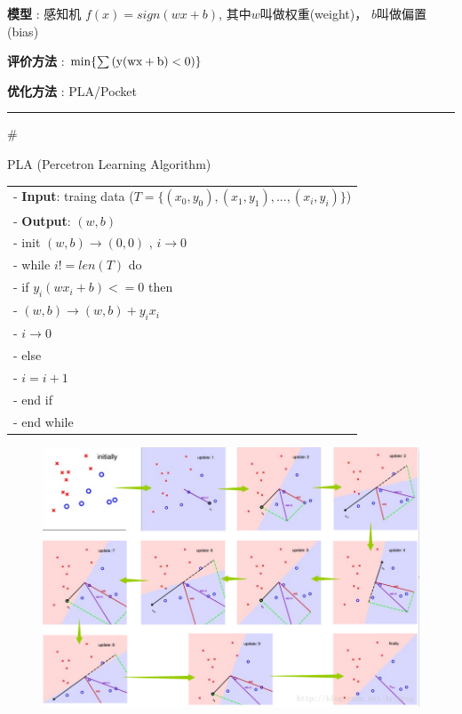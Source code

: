 \documentclass[11pt]{article}
\makeatletter
\def\maxwidth{\ifdim\Gin@nat@width>\linewidth\linewidth
    \else\Gin@nat@width\fi}
\let\Oldincludegraphics\includegraphics
\renewcommand{\includegraphics}[1]{\Oldincludegraphics[width=.8\maxwidth]{#1}}
\makeatother
\begin{document}
\textbf{模型} : 感知机 \(f(x)=sign(wx+b)\), 其中\(w\)叫做权重(weight)，
\(b\)叫做偏置(bias)

\textbf{评价方法} : \(\min \{ \sum {{\rm{(y(wx + b) < 0)}}} \}\)

\textbf{优化方法} : PLA/Pocket

    \begin{center}\rule{0.5\linewidth}{\linethickness}\end{center}

\#

PLA (Percetron Learning Algorithm)

\begin{longtable}[]{@{}l@{}}
\toprule
- \textbf{Input}: traing data
(\(T = \{(x_{0}, y_{0}), (x_{1}, y_{1}), ..., (x_{i}, y_{i})\}\))\tabularnewline
- \textbf{Output}: \((w, b)\)\tabularnewline
- init \((w, b)\rightarrow(0,0)\) , \(i\rightarrow 0\)\tabularnewline
- while \(i != len(T)\) do\tabularnewline
- if \(y_{i}(wx_{i}+b) <= 0\) then\tabularnewline
- \((w, b) \rightarrow (w, b) + y_{i}x_{i}\)\tabularnewline
- \(i\rightarrow 0\)\tabularnewline
- else\tabularnewline
- \(i=i+1\)\tabularnewline
- end if\tabularnewline
- end while\tabularnewline
\bottomrule
\end{longtable}

    \begin{figure}
\centering
\includegraphics{pla.png}
\caption{}
\end{figure}
\end{document}
